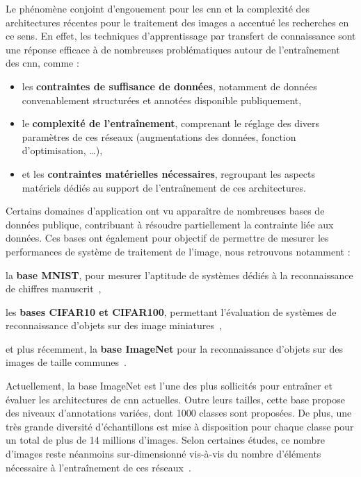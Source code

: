 Le phénomène conjoint d'engouement pour les \gls{cnn} et la complexité des architectures récentes pour le traitement des images a accentué les recherches en ce sens. En effet, les techniques d'apprentissage par transfert de connaissance sont une réponse efficace à de nombreuses problématiques autour de l'entraînement des \gls{cnn}, comme : 
\begin{itemize}
    \item les \textbf{contraintes de suffisance de données}, notamment de données convenablement structurées et annotées disponible publiquement,
    \item le \textbf{complexité de l'entraînement}, comprenant le réglage des divers paramètres de ces réseaux (augmentations des données, fonction d'optimisation, \ldots),
    \item et les \textbf{contraintes matérielles nécessaires}, regroupant les aspects matériels dédiés au support de l'entraînement de ces architectures.
\end{itemize}\par

Certains domaines d'application ont vu apparaître de nombreuses bases de données publique, contribuant à résoudre partiellement la contrainte liée aux données. Ces bases ont également pour objectif de permettre de mesurer les performances de système de traitement de l'image, nous retrouvons notamment : 
\begin{inlinerate}
    \item la \textbf{base MNIST}, pour mesurer l'aptitude de systèmes dédiés à la reconnaissance de chiffres manuscrit~\cite{lecun2010},
    \item les \textbf{bases CIFAR10 et CIFAR100}, permettant l'évaluation de systèmes de reconnaissance d'objets sur des image miniatures~\cite{Krizhevsky}, 
    \item et plus récemment, la \textbf{base ImageNet} pour la reconnaissance d'objets sur des images de taille communes~\cite{Deng2008}. 
\end{inlinerate}\par

Actuellement, la base ImageNet est l'une des plus sollicités pour entraîner et évaluer les architectures de \gls{cnn} actuelles. Outre leurs tailles, cette base propose des niveaux d'annotations variées, dont 1000 classes sont proposées. De plus, une très grande diversité d'échantillons est mise à disposition pour chaque classe pour un total de plus de 14 millions d'images. Selon certaines études, ce nombre d'images reste néanmoins sur-dimensionné vis-à-vis du nombre d'éléments nécessaire à l'entraînement de ces réseaux~\cite{Huh2016}.\par

